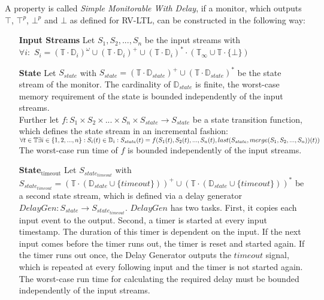 	\begin{definition}
		A property is called \textit{Simple Monitorable With Delay}, if a monitor, which outputs $\top$, $\top^p$, $\bot^p$ and $\bot$ as defined for RV-LTL, can be constructed in the following way:
		\begin{itemize}
			\item[\textbf{Input Streams}]
				Let $S_1, S_2, ..., S_n$ be the input streams with\\
				$\forall i:$ $S_i=(\mathbb{T}\cdot \mathbb{D}_i)^\omega\cup(\mathbb{T}\cdot \mathbb{D}_i)^+\cup(\mathbb{T}\cdot \mathbb{D}_i)^*\cdot(\mathbb{T}_\infty\cup\mathbb{T}\cdot\{\bot\})$
			\item[\textbf{State}]
				Let $S_{state}$ with $S_{state}= (\mathbb{T}\cdot \mathbb{D}_{state})^+\cup(\mathbb{T}\cdot \mathbb{D}_{state})^*$ be the state stream of the monitor. The cardinality of $\mathbb{D}_{state}$ is finite, the worst-case memory requirement of the state is bounded independently of the input streams.\\
				Further let $f: S_1 \times S_2 \times ... \times S_n \times S_{state}\rightarrow S_{state}$ be a state transition function, which defines the state stream in an incremental fashion:
				\begin{math}
					\forall t\in \mathbb T \exists i\in \{1,2,...,n\}: S_i(t)\in\mathbb D_i:\\
					S_{state}(t)= f(S_1(t), S_2(t), ..., S_n(t), last(S_{state}, merge(S_1, S_2, ..., S_n))(t))
				\end{math}\\
				The worst-case run time of $f$ is bounded independently of the input streams.
			\item[\textbf{State$_\text{timeout}$}]
				Let $S_{state_{timeout}}$ with $S_{state_{timeout}}= (\mathbb{T}\cdot (\mathbb{D}_{state}\cup \{timeout\}))^+\cup(\mathbb{T}\cdot (\mathbb{D}_{state}\cup \{timeout\}))^*$ be a second state stream, which is defined via a delay generator $DelayGen: S_{state}\rightarrow S_{state_{timeout}}$. $DelayGen$ has two tasks. First, it copies each input event to the output. Second, a timer is started at every input timestamp. The duration of this timer is dependent on the input. If the next input comes before the timer runs out, the timer is reset and started again. If the timer runs out once, the Delay Generator outputs the $timeout$ signal, which is repeated at every following input and the timer is not started again. The worst-case run time for calculating the required delay must be bounded independently of the input streams.

\end{itemize}
\end{definition}
